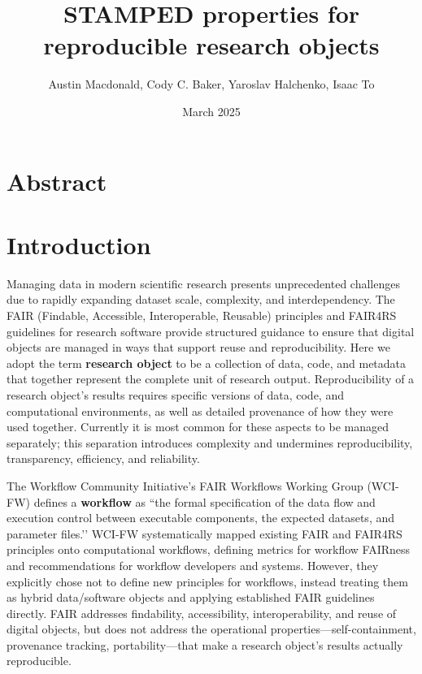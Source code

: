 \documentclass{article}
\title{STAMPED properties for reproducible research objects}
\author{Austin Macdonald, Cody C. Baker, Yaroslav Halchenko, Isaac To}
\date{March 2025}
\begin{document}
\maketitle

\section{Abstract}


\section{Introduction}

Managing data in modern scientific research presents unprecedented challenges due to rapidly expanding dataset scale, complexity, and interdependency.
The FAIR (Findable, Accessible, Interoperable, Reusable) principles\cite{wilkinson_fair_2016} and FAIR4RS guidelines\cite{barker_introducing_2022} for research software provide structured guidance to ensure that digital objects are managed in ways that support reuse and reproducibility.
Here we adopt the term \textbf{research object} to be a collection of data, code, and metadata that together represent the complete unit of research output.
Reproducibility of a research object's results requires specific versions of data, code, and computational environments, as well as detailed provenance of how they were used together.
Currently it is most common for these aspects to be managed separately; this separation introduces complexity and undermines reproducibility, transparency, efficiency, and reliability.

The Workflow Community Initiative’s FAIR Workflows Working Group (WCI-FW)\cite{wilkinson_applying_2025} defines a \textbf{workflow} as ``the formal specification of the data flow and execution control between executable components, the expected datasets, and parameter files.’’
WCI-FW systematically mapped existing FAIR and FAIR4RS principles onto computational workflows, defining metrics for workflow FAIRness and recommendations for workflow developers and systems.
However, they explicitly chose not to define new principles for workflows, instead treating them as hybrid data/software objects and applying established FAIR guidelines directly.
FAIR addresses findability, accessibility, interoperability, and reuse of digital objects, but does not address the operational properties---self-containment, provenance tracking, portability---that make a research object’s results actually reproducible.
\end{document}
